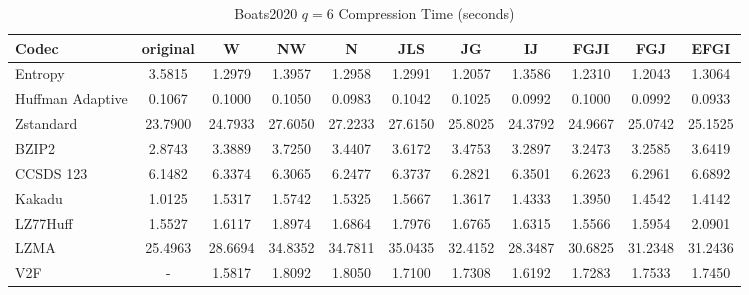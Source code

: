 \documentclass{article}
\begin{document}
\begin{table}[h!]
\centering
\caption{Boats2020 $q=6$ Compression Time (seconds)}
\begin{tabular}{|l|cccccccccc|}
\hline
Codec &  original &       W &      NW &       N &     JLS &      JG &      IJ &    FGJI &     FGJ &    EFGI \\
\hline
Entropy & 3.5815 & 1.2979 & 1.3957 & 1.2958 & 1.2991 & 1.2057 & 1.3586 & 1.2310 & 1.2043 & 1.3064         \\
\hline
Huffman Adaptive &    0.1067 &  0.1000 &  0.1050 &  0.0983 &  0.1042 &  0.1025 &  0.0992 &  0.1000 &  0.0992 &  0.0933 \\
Zstandard        &   23.7900 & 24.7933 & 27.6050 & 27.2233 & 27.6150 & 25.8025 & 24.3792 & 24.9667 & 25.0742 & 25.1525 \\
BZIP2            &    2.8743 &  3.3889 &  3.7250 &  3.4407 &  3.6172 &  3.4753 &  3.2897 &  3.2473 &  3.2585 &  3.6419 \\
CCSDS 123        &    6.1482 &  6.3374 &  6.3065 &  6.2477 &  6.3737 &  6.2821 &  6.3501 &  6.2623 &  6.2961 &  6.6892 \\
Kakadu           &    1.0125 &  1.5317 &  1.5742 &  1.5325 &  1.5667 &  1.3617 &  1.4333 &  1.3950 &  1.4542 &  1.4142 \\
LZ77Huff         &    1.5527 &  1.6117 &  1.8974 &  1.6864 &  1.7976 &  1.6765 &  1.6315 &  1.5566 &  1.5954 &  2.0901 \\
LZMA             &   25.4963 & 28.6694 & 34.8352 & 34.7811 & 35.0435 & 32.4152 & 28.3487 & 30.6825 & 31.2348 & 31.2436 \\
V2F              &    - &  1.5817 &  1.8092 &  1.8050 &  1.7100 &  1.7308 &  1.6192 &  1.7283 &  1.7533 &  1.7450 \\
\hline
\end{tabular}
\end{table}

\newpage
\end{document}

